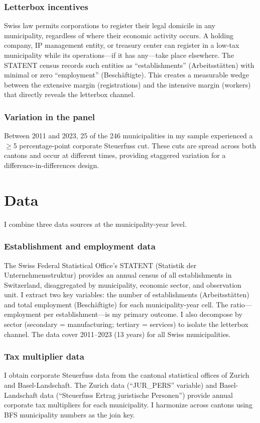 \documentclass[12pt]{article}
\begin{document}
\subsubsection*{Letterbox incentives} Swiss law permits corporations to register their legal domicile in any municipality, regardless of where their economic activity occurs. A holding company, IP management entity, or treasury center can register in a low-tax municipality while its operations---if it has any---take place elsewhere. The STATENT census records such entities as ``establishments'' (Arbeitsstätten) with minimal or zero ``employment'' (Beschäftigte). This creates a measurable wedge between the extensive margin (registrations) and the intensive margin (workers) that directly reveals the letterbox channel.

\subsubsection*{Variation in the panel} Between 2011 and 2023, 25 of the 246 municipalities in my sample experienced a $\geq$5 percentage-point corporate Steuerfuss cut. These cuts are spread across both cantons and occur at different times, providing staggered variation for a difference-in-differences design.

\section{Data}

I combine three data sources at the municipality-year level.

\subsubsection*{Establishment and employment data} The Swiss Federal Statistical Office's STATENT (Statistik der Unternehmensstruktur) provides an annual census of all establishments in Switzerland, disaggregated by municipality, economic sector, and observation unit. I extract two key variables: the number of establishments (Arbeitsstätten) and total employment (Beschäftigte) for each municipality-year cell. The ratio---employment per establishment---is my primary outcome. I also decompose by sector (secondary = manufacturing; tertiary = services) to isolate the letterbox channel. The data cover 2011--2023 (13 years) for all Swiss municipalities.

\subsubsection*{Tax multiplier data} I obtain corporate Steuerfuss data from the cantonal statistical offices of Zurich and Basel-Landschaft. The Zurich data (``JUR\_PERS'' variable) and Basel-Landschaft data (``Steuerfuss Ertrag juristische Personen'') provide annual corporate tax multipliers for each municipality. I harmonize across cantons using BFS municipality numbers as the join key.
\end{document}
